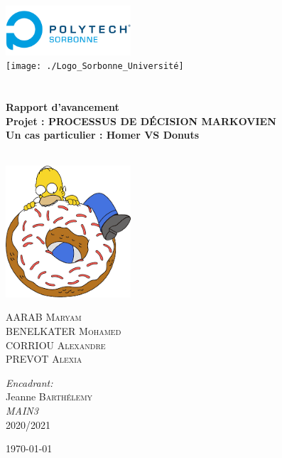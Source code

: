 \begin{titlepage}
\begin{center}

\includegraphics[width=0.35\textwidth]{./Logo_Polytech_Sorbonne}~\\[1cm]
\texttt{[image: ./Logo\_Sorbonne\_Université]}~\\[1cm]

\textsc{\Large }\\[0.5cm]

\HRule \\[0.4cm]

{\huge \bfseries Rapport d'avancement\\
\large
Projet : PROCESSUS DE DÉCISION MARKOVIEN\\
Un cas particulier : Homer VS Donuts \\[0.4cm] }

\HRule \\[1.5cm]

\includegraphics[width=0.35\textwidth]{./homer}~\\[1cm]

\begin{minipage}{0.4\textwidth}
\begin{flushleft} \large
AARAB \textsc{Maryam}\\
BENELKATER \textsc{Mohamed}\\
CORRIOU \textsc{Alexandre}\\
PREVOT \textsc{Alexia}
\end{flushleft}
\end{minipage}
\begin{minipage}{0.4\textwidth}
\begin{flushright} \large
\emph{Encadrant:} \\
Jeanne \textsc{Barthélemy}\\
\emph{MAIN3} \\
2020/2021
\end{flushright}
\end{minipage}

\vfill

{\large \today}

\end{center}
\end{titlepage}